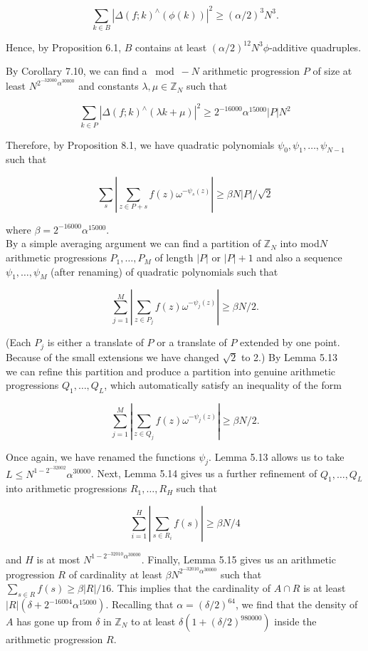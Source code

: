\documentclass[10pt]{article}
\begin{document}
$$
\sum_{k \in B}\left|\Delta(f ; k)^{\wedge}(\phi(k))\right|^{2} \geqslant(\alpha / 2)^{3} N^{3} .
$$

Hence, by Proposition 6.1, $B$ contains at least $(\alpha / 2)^{12} N^{3} \phi$-additive quadruples.

By Corollary 7.10, we can find a $\bmod -N$ arithmetic progression $P$ of size at least $N^{2^{-32000}\alpha^{30000}}$ and constants $\lambda, \mu \in \mathbb{Z}_{N}$ such that

$$
\sum_{k \in P}\left|\Delta(f ; k)^{\wedge}(\lambda k+\mu)\right|^{2} \geqslant 2^{-16000} \alpha^{15000}|P| N^{2}
$$

Therefore, by Proposition 8.1, we have quadratic polynomials $\psi_{0}, \psi_{1}, \ldots, \psi_{N-1}$ such that

$$
\sum_{s}\left|\sum_{z \in P+s} f(z) \omega^{-\psi_{s}(z)}\right| \geqslant \beta N|P| / \sqrt{2}
$$

where $\beta=2^{-16000} \alpha^{15000}$.\\
By a simple averaging argument we can find a partition of $\mathbb{Z}_{N}$ into mod$N$ arithmetic progressions $P_{1}, \ldots, P_{M}$ of length $|P|$ or $|P|+1$ and also a sequence $\psi_{1}, \ldots, \psi_{M}$ (after renaming) of quadratic polynomials such that

$$
\sum_{j=1}^{M}\left|\sum_{z \in P_{j}} f(z) \omega^{-\psi_{j}(z)}\right| \geqslant \beta N / 2 .
$$

(Each $P_{j}$ is either a translate of $P$ or a translate of $P$ extended by one point. Because of the small extensions we have changed $\sqrt{2}$ to 2.) By Lemma 5.13\\
we can refine this partition and produce a partition into genuine arithmetic progressions $Q_{1}, \ldots, Q_{L}$, which automatically satisfy an inequality of the form

$$
\sum_{j=1}^{M}\left|\sum_{z \in Q_{j}} f(z) \omega^{-\psi_{j}(z)}\right| \geqslant \beta N / 2 .
$$

Once again, we have renamed the functions $\psi_{j}$. Lemma 5.13 allows us to take $L \leqslant N^{1-2^{-32002}} \alpha^{30000}$. Next, Lemma 5.14 gives us a further refinement of $Q_{1}, \ldots, Q_{L}$ into arithmetic progressions $R_{1}, \ldots, R_{H}$ such that

$$
\sum_{i=1}^{H}\left|\sum_{s \in R_{i}} f(s)\right| \geqslant \beta N / 4
$$

and $H$ is at most $N^{1-2^{-32010}\alpha^{30000}}$. Finally, Lemma 5.15 gives us an arithmetic progression $R$ of cardinality at least $\beta N^{2^{-32010}\alpha^{30000}}$ such that $\sum_{s \in R} f(s) \geqslant \beta|R| / 16$. This implies that the cardinality of $A \cap R$ is at least $|R|\left(\delta+2^{-16004} \alpha^{15000}\right)$. Recalling that $\alpha=(\delta / 2)^{64}$, we find that the density of $A$ has gone up from $\delta$ in $\mathbb{Z}_{N}$ to at least $\delta\left(1+(\delta / 2)^{980000}\right)$ inside the arithmetic progression $R$.
\end{document}
